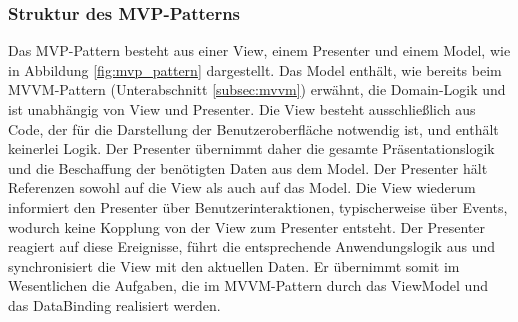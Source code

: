 \subsubsection{Struktur des MVP-Patterns}
Das MVP-Pattern besteht aus einer View, einem Presenter und einem Model, wie in Abbildung \ref{fig:mvp_pattern} dargestellt. Das Model enthält, wie bereits beim MVVM-Pattern (Unterabschnitt \ref{subsec:mvvm}) erwähnt, die Domain-Logik und ist unabhängig von View und Presenter. 
Die View besteht ausschließlich aus Code, der für die Darstellung der Benutzeroberfläche notwendig ist, und enthält keinerlei Logik. Der Presenter übernimmt daher die gesamte Präsentationslogik und die Beschaffung der benötigten Daten aus dem Model. Der Presenter hält Referenzen sowohl auf die View als auch auf das Model. Die View wiederum informiert den Presenter über Benutzerinteraktionen, typischerweise über Events, wodurch keine Kopplung von der View zum Presenter entsteht. Der Presenter reagiert auf diese Ereignisse, führt die entsprechende Anwendungslogik aus und synchronisiert die View mit den aktuellen Daten. Er übernimmt somit im Wesentlichen die Aufgaben, die im MVVM-Pattern durch das ViewModel und das DataBinding realisiert werden.











